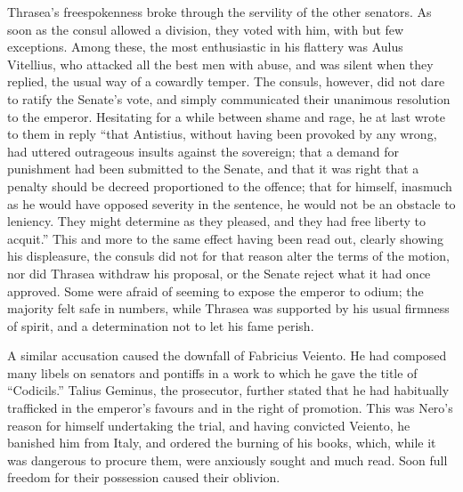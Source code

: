
Thrasea's freespokenness broke through the servility of the other senators. As soon as the consul allowed a division, they voted with him, with but few exceptions. Among these, the most enthusiastic in his flattery was Aulus Vitellius, who attacked all the best men with abuse, and was silent when they replied, the usual way of a cowardly temper. The consuls, however, did not dare to ratify the Senate's vote, and simply communicated their unanimous resolution to the emperor. Hesitating for a while between shame and rage, he at last wrote to them in reply ``that Antistius, without having been provoked by any wrong, had uttered outrageous insults against the sovereign; that a demand for punishment had been submitted to the Senate, and that it was right that a penalty should be decreed proportioned to the offence; that for himself, inasmuch as he would have opposed severity in the sentence, he would not be an obstacle to leniency. They might determine as they pleased, and they had free liberty to acquit.'' This and more to the same effect having been read out, clearly showing his displeasure, the consuls did not for that reason alter the terms of the motion, nor did Thrasea withdraw his proposal, or the Senate reject what it had once approved. Some were afraid of seeming to expose the emperor to odium; the majority felt safe in numbers, while Thrasea was supported by his usual firmness of spirit, and a determination not to let his fame perish.


A similar accusation caused the downfall of Fabricius Veiento. He had composed many libels on senators and pontiffs in a work to which he gave the title of ``Codicils.'' Talius Geminus, the prosecutor, further stated that he had habitually trafficked in the emperor's favours and in the right of promotion. This was Nero's reason for himself undertaking the trial, and having convicted Veiento, he banished him from Italy, and ordered the burning of his books, which, while it was dangerous to procure them, were anxiously sought and much read. Soon full freedom for their possession caused their oblivion.


